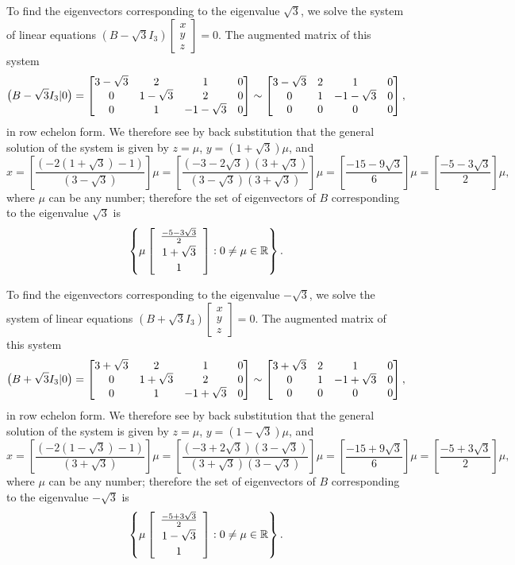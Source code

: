 \documentclass[a4paper]{amsart}
\renewenvironment{solution}{\SolutionInline}{\endSolutionInline}
\begin{document}
\begin{solution}
 To find the eigenvectors corresponding to the eigenvalue
 $\sqrt{3}$, we solve the system of linear equations $(B -
 \sqrt{3}I_3)\left[
 \begin{array}{c}x \\ y\\z
 \end{array} \right] = 0$. The augmented matrix of this system
 $$
 \big(B - \sqrt{3}I_3|0\big) = \left[\begin{matrix} 3-\sqrt{3}& 2&
 1&0\\0&1-\sqrt{3}&2&0\\0&1&-1-\sqrt{3}&0\end{matrix}\right] \sim
 \left[\begin{matrix} 3-\sqrt{3}& 2&
 1&0\\0&1&-1-\sqrt{3}&0\\0&0&0&0\end{matrix}\right],
 $$
 in row echelon form. We therefore see by back substitution that
 the general solution of the system is given by $z = \mu$, $y =
 (1+\sqrt{3})\mu$, and $${\textstyle x =
 \left[\frac{(-2(1+\sqrt{3})-1)}{(3-\sqrt{3})}\right]\mu =
 \left[\frac{(-3
 -2\sqrt{3})(3+\sqrt{3})}{(3-\sqrt{3})(3+\sqrt{3})}\right]\mu =
 \left[\frac{-15-9\sqrt{3}}{6}\right]\mu =
 \left[\frac{-5-3\sqrt{3}}{2}\right]\mu,}
 $$
 where $\mu$ can be any number; therefore the set of eigenvectors
 of $B$ corresponding to the eigenvalue $\sqrt{3}$ is
 $$
 \left\{ \mu \left[ \begin{array}{c}
 \frac{-5-3\sqrt{3}}{2}\\[2pt]1+\sqrt{3}\\[2pt]1
 \end{array} \right] : 0 \neq \mu \in {\mathbb{R}} \right\}.
 $$

 To find the eigenvectors corresponding to the eigenvalue
 $-\sqrt{3}$, we solve the system of linear equations $(B +
 \sqrt{3}I_3)\left[
 \begin{array}{c}x \\ y\\z
 \end{array} \right] = 0$. The augmented matrix of this system
 $$
 \big(B + \sqrt{3}I_3|0\big) = \left[\begin{matrix} 3+\sqrt{3}& 2&
 1&0\\0&1+\sqrt{3}&2&0\\0&1&-1+\sqrt{3}&0\end{matrix}\right] \sim
 \left[\begin{matrix} 3+\sqrt{3}& 2&
 1&0\\0&1&-1+\sqrt{3}&0\\0&0&0&0\end{matrix}\right],
 $$
 in row echelon form. We therefore see by back substitution that
 the general solution of the system is given by $z = \mu$, $y =
 (1-\sqrt{3})\mu$, and $${\textstyle x =
 \left[\frac{(-2(1-\sqrt{3})-1)}{(3+\sqrt{3})}\right]\mu =
 \left[\frac{(-3
 +2\sqrt{3})(3-\sqrt{3})}{(3+\sqrt{3})(3-\sqrt{3})}\right]\mu =
 \left[\frac{-15+9\sqrt{3}}{6}\right]\mu =
 \left[\frac{-5+3\sqrt{3}}{2}\right]\mu,}
 $$
 where $\mu$ can be any number; therefore the set of eigenvectors
 of $B$ corresponding to the eigenvalue $-\sqrt{3}$ is
 $$
 \left\{ \mu \left[ \begin{array}{c}
 \frac{-5+3\sqrt{3}}{2}\\[2pt]1-\sqrt{3}\\[2pt]1
 \end{array} \right] : 0 \neq \mu \in {\mathbb{R}} \right\}.
 $$
\end{solution}
\end{document}
